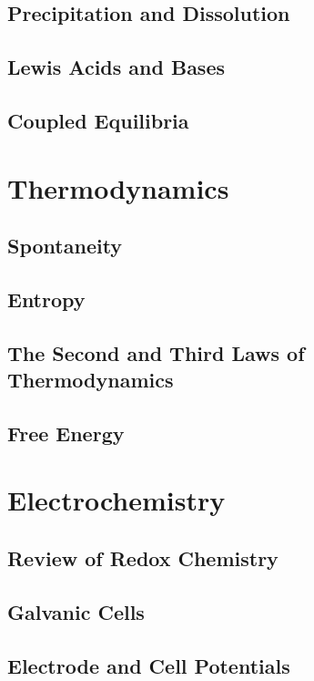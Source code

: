 \documentclass[12pt, openany, letterpaper]{memoir}
\begin{document}
\section{Precipitation and Dissolution}

\section{Lewis Acids and Bases}

\section{Coupled Equilibria}

\chapter{Thermodynamics}

\section{Spontaneity}

\section{Entropy}

\section{The Second and Third Laws of Thermodynamics}

\section{Free Energy}

\chapter{Electrochemistry}

\section{Review of Redox Chemistry}

\section{Galvanic Cells}

\section{Electrode and Cell Potentials}
\end{document}
